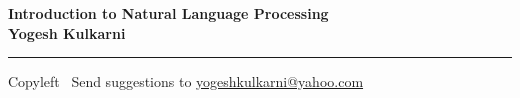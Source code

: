 
\graphicspath{{images/}}

\footnotesize


\begin{center}
\Large{\textbf{Introduction to Natural Language Processing\\ Yogesh Kulkarni}}  
\end{center}

\begin{multicols}{2}

\end{multicols}

\rule{\linewidth}{0.25pt}
\scriptsize
Copyleft \textcopyleft\  Send suggestions to 
\href{http://www.yogeshkulkarni.com}{yogeshkulkarni@yahoo.com}


